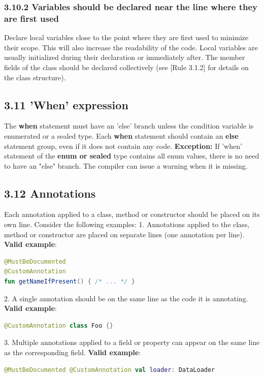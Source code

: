 \subsubsection*{\textbf{3.10.2 Variables should be declared near the line where they are first used}}
\leavevmode\newline
\label{sec:3.10.2}
Declare local variables close to the point where they are first used to minimize their scope. This will also increase the readability of the code.
Local variables are usually initialized during their declaration or immediately after.
The member fields of the class should be declared collectively (see [Rule 3.1.2] for details on the class structure).
\subsection*{\textbf{3.11 'When' expression}}
\label{sec:3.11}
The \textbf{when} statement must have an 'else' branch unless the condition variable is enumerated or a sealed type.
Each \textbf{when} statement should contain an \textbf{else} statement group, even if it does not contain any code.
\textbf{Exception:} If 'when' statement of the \textbf{enum or sealed} type contains all enum values, there is no need to have an "else" branch.
The compiler can issue a warning when it is missing.
\subsection*{\textbf{3.12 Annotations}}
\label{sec:3.12}
Each annotation applied to a class, method or constructor should be placed on its own line. Consider the following examples:
1. Annotations applied to the class, method or constructor are placed on separate lines (one annotation per line). 
\textbf{Valid example}:
\begin{lstlisting}[language=Kotlin]
@MustBeDocumented
@CustomAnnotation
fun getNameIfPresent() { /* ... */ }
\end{lstlisting}
2. A single annotation should be on the same line as the code it is annotating.
\textbf{Valid example}:
\begin{lstlisting}[language=Kotlin]
@CustomAnnotation class Foo {}
\end{lstlisting}
3. Multiple annotations applied to a field or property can appear on the same line as the corresponding field.
\textbf{Valid example}:
\begin{lstlisting}[language=Kotlin]
@MustBeDocumented @CustomAnnotation val loader: DataLoader
\end{lstlisting}
